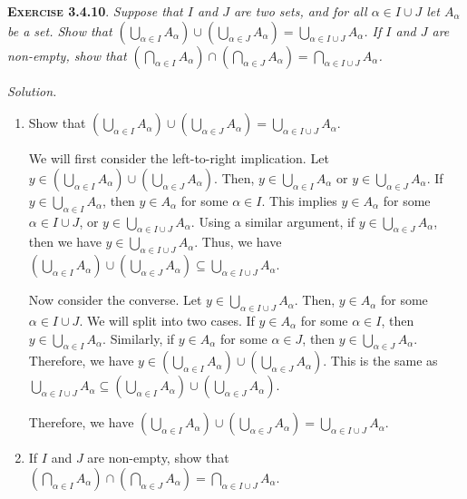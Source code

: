 \documentclass[12pt]{article}
\theoremstyle{remark}
\newenvironment{exer}[2]{
    \noindent \setlength{\parskip}{1em}%
    \textsc{\textbf{Exercise #1}}. \textit{#2} \par
    \noindent \textit{Solution.} %
}{\bigskip}
\begin{document}
\begin{exer}{3.4.10}{
    Suppose that $I$ and $J$ are two sets, and for all $\alpha \in I \cup J$ let $A_\alpha$ be a set.
    Show that $(\bigcup_{\alpha \in I} A_\alpha) \cup (\bigcup_{\alpha \in J} A_\alpha) = \bigcup_{\alpha \in I \cup J} A_\alpha$.
    If $I$ and $J$ are non-empty, show that $(\bigcap_{\alpha \in I} A_\alpha) \cap (\bigcap_{\alpha \in J} A_\alpha) = \bigcap_{\alpha \in I \cup J} A_\alpha$.
}
    \begin{enumerate}[topsep=0mm,label=(\alph*)]
        \item Show that $(\bigcup_{\alpha \in I} A_\alpha) \cup (\bigcup_{\alpha \in J} A_\alpha) = \bigcup_{\alpha \in I \cup J} A_\alpha$.
    
            We will first consider the left-to-right implication.
            Let $y \in (\bigcup_{\alpha \in I} A_\alpha) \cup (\bigcup_{\alpha \in J} A_\alpha)$.
            Then, $y \in \bigcup_{\alpha \in I} A_\alpha$ or $y \in \bigcup_{\alpha \in J} A_\alpha$.
            If $y \in \bigcup_{\alpha \in I} A_\alpha$, then $y \in A_\alpha$ for some $\alpha \in I$.
            This implies $y \in A_\alpha$ for some $\alpha \in I \cup J$, or $y \in \bigcup_{\alpha \in I \cup J} A_\alpha$.
            Using a similar argument, if $y \in \bigcup_{\alpha \in J} A_\alpha$, then we have $y \in \bigcup_{\alpha \in I \cup J} A_\alpha$.
            Thus, we have $(\bigcup_{\alpha \in I} A_\alpha) \cup (\bigcup_{\alpha \in J} A_\alpha) \subseteq \bigcup_{\alpha \in I \cup J} A_\alpha$.
        
            Now consider the converse.
            Let $y \in \bigcup_{\alpha \in I \cup J} A_\alpha$.
            Then, $y \in A_\alpha$ for some $\alpha \in I \cup J$.
            We will split into two cases.
            If $y \in A_\alpha$ for some $\alpha \in I$, then $y \in \bigcup_{\alpha \in I} A_\alpha$.
            Similarly, if $y \in A_\alpha$ for some $\alpha \in J$, then $y \in \bigcup_{\alpha \in J} A_\alpha$.
            Therefore, we have $y \in (\bigcup_{\alpha \in I} A_\alpha) \cup (\bigcup_{\alpha \in J} A_\alpha)$.
            This is the same as $\bigcup_{\alpha \in I \cup J} A_\alpha \subseteq (\bigcup_{\alpha \in I} A_\alpha) \cup (\bigcup_{\alpha \in J} A_\alpha)$.
        
            Therefore, we have $(\bigcup_{\alpha \in I} A_\alpha) \cup (\bigcup_{\alpha \in J} A_\alpha) = \bigcup_{\alpha \in I \cup J} A_\alpha$.

        \item If $I$ and $J$ are non-empty, show that $(\bigcap_{\alpha \in I} A_\alpha) \cap (\bigcap_{\alpha \in J} A_\alpha) = \bigcap_{\alpha \in I \cup J} A_\alpha$.


\end{enumerate}
\end{exer}
\end{document}
